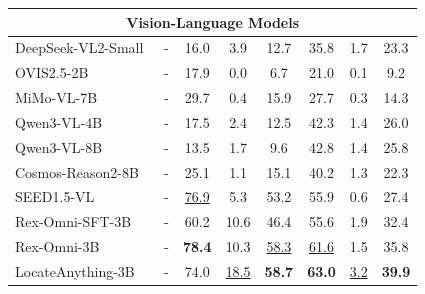 \begin{table}[t]
{\begin{tabular}{l|c|ccc|ccc}
            \multicolumn{8}{c}{{Vision-Language Models}} \\
            \midrule
            DeepSeek-VL2-Small~\citep{wu2024deepseekvl2mixtureofexpertsvisionlanguagemodels} & - & 16.0 & 3.9 & 12.7 & 35.8 & 1.7 & 23.3 \\
            OVIS2.5-2B~\citep{lu2025ovis25technicalreport}         & - & 17.9 & 0.0 & 6.7 & 21.0 & 0.1 & 9.2 \\
            MiMo-VL-7B~\citep{coreteam2025mimovltechnicalreport}         & - & 29.7 & 0.4 & 15.9 & 27.7 & 0.3 & 14.3 \\
            Qwen3-VL-4B~\citep{bai2025qwen3vltechnicalreport}        & - & 17.5 & 2.4 & 12.5 & 42.3 & 1.4 & 26.0 \\
            Qwen3-VL-8B~\citep{bai2025qwen3vltechnicalreport}        & - & 13.5 & 1.7 & 9.6  & 42.8 & 1.4 & 25.8 \\
            Cosmos-Reason2-8B~\citep{cosmosreason2}        & - & 25.1 & 1.1 & 15.1 & 40.2 & 1.3 & 22.3 \\
            SEED1.5-VL~\citep{guo2025seed15vltechnicalreport}         & - & \underline{76.9} & 5.3 & 53.2 & 55.9 & 0.6 & 27.4 \\
            Rex-Omni-SFT-3B~\citep{jiang2025rexomni}       & - & 60.2 & 10.6 & 46.4 & 55.6 & 1.9 & 32.4 \\
            Rex-Omni-3B~\citep{jiang2025rexomni}           & - & \textbf{78.4} & 10.3 & \underline{58.3} & \underline{61.6} & 1.5 & 35.8 \\
            \rowcolor{lightblue!10}
            LocateAnything-3B     & - & 74.0 & \underline{18.5} & \textbf{58.7} & \textbf{63.0} & \underline{3.2} & \textbf{39.9} \\
            \bottomrule
        \end{tabular}
    }
    \label{tab:dense_object_detection}
\end{table}
